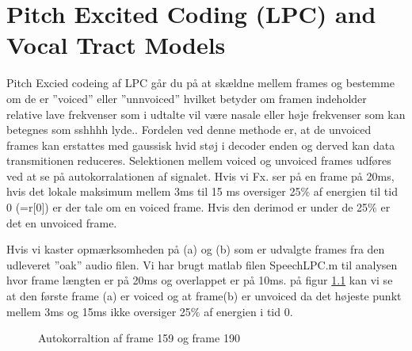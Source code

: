 \chapter{Pitch Excited Coding (LPC) and Vocal Tract Models}
\label{ch:part4}

Pitch Excied codeing af LPC går du på at skældne mellem frames og bestemme om de er ''voiced'' eller ''unnvoiced'' hvilket betyder om framen indeholder relative lave frekvenser som i udtalte vil være nasale eller høje frekvenser som kan betegnes som sshhhh lyde..
Fordelen ved denne methode er, at de unvoiced frames kan erstattes med gaussisk hvid støj i decoder enden og derved kan data transmitionen reduceres. Selektionen mellem voiced og unvoiced frames udføres ved at se på autokorralationen af signalet. Hvis vi Fx. ser på en frame på 20ms, hvis det lokale maksimum mellem 3ms til 15 ms oversiger 25$\%$ af energien til tid 0 (=r[0]) er der tale om en voiced frame. Hvis den derimod er under de 25$\%$ er det en unvoiced frame.

  Hvis vi kaster opmærksomheden på (a) og (b) som er udvalgte frames fra den udleveret ''oak'' audio filen. Vi har brugt matlab filen SpeechLPC.m til analysen hvor frame længten er på 20ms og overlappet er på 10ms. på figur \ref{fig:part4_autoko}  
kan vi se at den første frame (a) er voiced og at frame(b) er unvoiced da det højeste punkt mellem 3ms og 15ms ikke oversiger 25$\%$ af energien i tid 0. 

 \begin{figure}[!h]
	\centering
	\caption{ Autokorraltion af frame 159 og frame 190}
	\label{fig:part4_autoko}
\end{figure}

